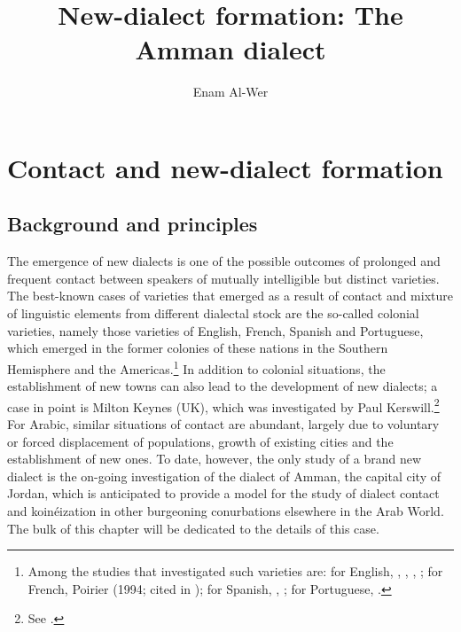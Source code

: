 \documentclass[output=paper]{langsci/langscibook}
\author{Enam Al-Wer\affiliation{University of Essex}}
\title{New-dialect formation: The Amman dialect}
\begin{document}
\maketitle 

\section{Contact and new-dialect formation} \label{new}


\subsection{Background and principles}

The emergence of new dialects is one of the possible outcomes of prolonged and frequent contact between speakers of mutually intelligible but distinct varieties. The best-known cases of varieties that emerged as a result of contact and mixture of linguistic elements from different dialectal stock are the so-called colonial varieties, namely those varieties of English, French, Spanish and Portuguese, which emerged in the former colonies of these nations in the Southern Hemisphere and the Americas.\footnote{Among the studies that investigated such varieties are: for English, \citet{Trudgill2004}, \citet{GordonEtAl2004}, \citet{Sudbury2000}, \citet{Schreier2003}; for French, Poirier (1994; cited in \citealt{Trudgill2004}); for Spanish, \citet{Lipski1994}, \citet{Penny2000}; for Portuguese, \citet{Mattoso1972}.} In addition to colonial situations, the establishment of new towns can also lead to the development of new dialects; a case in point is Milton Keynes (UK), which was investigated by Paul Kerswill.\footnote{See \citet{KerswillWilliams2005}.} For Arabic, similar situations of contact are abundant, largely due to voluntary or forced displacement of populations, growth of existing cities and the establishment of new ones. To date, however, the only study of a brand new dialect is the on-going investigation of the dialect of Amman, the capital city of Jordan, which is anticipated to provide a model for the study of dialect contact and koinéization in other burgeoning conurbations elsewhere in the Arab World. The bulk of this chapter will be dedicated to the details of this case.
\end{document}
